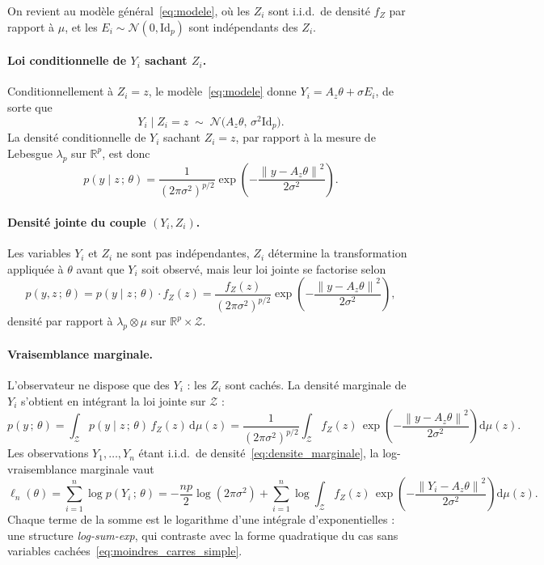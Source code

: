 \documentclass[12pt, a4paper]{article}
\theoremstyle{definition}
\newcommand{\R}{\mathbb{R}}
\newcommand{\Zcal}{\mathcal{Z}}
\newcommand{\Ncal}{\mathcal{N}}
\newcommand{\norm}[1]{\left\|#1\right\|}
\newcommand{\Id}{\mathrm{Id}}
\begin{document}
On revient au modèle général~\eqref{eq:modele}, où les $Z_i$ sont i.i.d.\ de
densité $f_Z$ par rapport à $\mu$, et les $E_i \sim \Ncal(0, \Id_p)$ sont
indépendants des $Z_i$.

\paragraph{Loi conditionnelle de $Y_i$ sachant $Z_i$.}
Conditionnellement à $Z_i = z$, le modèle~\eqref{eq:modele} donne
$Y_i = A_z\theta + \sigma E_i$, de sorte que
\[
    Y_i \mid Z_i = z \;\sim\; \Ncal\bigl(A_z\theta,\, \sigma^2\Id_p\bigr).
\]
La densité conditionnelle de $Y_i$ sachant $Z_i = z$, par rapport à la mesure
de Lebesgue $\lambda_p$ sur $\R^p$, est donc
\begin{equation}
    p(y \mid z\,;\,\theta)
    = \frac{1}{(2\pi\sigma^2)^{p/2}}
      \exp\!\left(-\frac{\norm{y - A_z\theta}^2}{2\sigma^2}\right).
    \label{eq:densite_cond}
\end{equation}

\paragraph{Densité jointe du couple $(Y_i, Z_i)$.}
Les variables $Y_i$ et $Z_i$ ne sont pas indépendantes, $Z_i$ détermine la
transformation appliquée à $\theta$ avant que $Y_i$ soit observé, mais leur
loi jointe se factorise selon
\[
    p(y, z\,;\,\theta)
    = p(y \mid z\,;\,\theta)\cdot f_Z(z)
    = \frac{f_Z(z)}{(2\pi\sigma^2)^{p/2}}
      \exp\!\left(-\frac{\norm{y - A_z\theta}^2}{2\sigma^2}\right),
\]
densité par rapport à $\lambda_p \otimes \mu$ sur $\R^p \times \Zcal$.

\paragraph{Vraisemblance marginale.}
L'observateur ne dispose que des $Y_i$ : les $Z_i$ sont cachés. La densité
marginale de $Y_i$ s'obtient en intégrant la loi jointe sur $\Zcal$ :
\begin{equation}
    p(y\,;\,\theta)
    = \int_\Zcal p(y \mid z\,;\,\theta)\,f_Z(z)\,\mathrm{d}\mu(z)
    = \frac{1}{(2\pi\sigma^2)^{p/2}}
      \int_\Zcal f_Z(z)\,
      \exp\!\left(-\frac{\norm{y - A_z\theta}^2}{2\sigma^2}\right)\mathrm{d}\mu(z).
    \label{eq:densite_marginale}
\end{equation}
Les observations $Y_1, \ldots, Y_n$ étant i.i.d.\ de densité~\eqref{eq:densite_marginale},
la log-vraisemblance marginale vaut
\begin{equation}
    \ell_n(\theta)
    = \sum_{i=1}^{n} \log p(Y_i\,;\,\theta)
    = -\frac{np}{2}\log(2\pi\sigma^2)
      + \sum_{i=1}^{n} \log\!\int_\Zcal f_Z(z)\,
        \exp\!\left(-\frac{\norm{Y_i - A_z\theta}^2}{2\sigma^2}\right)\mathrm{d}\mu(z).
    \label{eq:logvraisemblance}
\end{equation}
Chaque terme de la somme est le logarithme d'une intégrale d'exponentielles :
une structure \textit{log-sum-exp}, qui contraste avec la forme quadratique
du cas sans variables cachées~\eqref{eq:moindres_carres_simple}.
\end{document}
